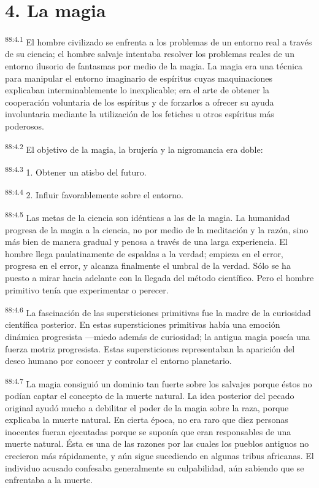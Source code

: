 \documentclass[twoside, 11pt]{book}
\begin{document}
\section*{4. La magia}
\par
\textsuperscript{88:4.1} El hombre civilizado se enfrenta a los problemas de un entorno real a través de su ciencia; el hombre salvaje intentaba resolver los problemas reales de un entorno ilusorio de fantasmas por medio de la magia. La magia era una técnica para manipular el entorno imaginario de espíritus cuyas maquinaciones explicaban interminablemente lo inexplicable; era el arte de obtener la cooperación voluntaria de los espíritus y de forzarlos a ofrecer su ayuda involuntaria mediante la utilización de los fetiches u otros espíritus más poderosos.

\par
\textsuperscript{88:4.2} El objetivo de la magia, la brujería y la nigromancia era doble:

\par
\textsuperscript{88:4.3} 1. Obtener un atisbo del futuro.

\par
\textsuperscript{88:4.4} 2. Influir favorablemente sobre el entorno.

\par
\textsuperscript{88:4.5} Las metas de la ciencia son idénticas a las de la magia. La humanidad progresa de la magia a la ciencia, no por medio de la meditación y la razón, sino más bien de manera gradual y penosa a través de una larga experiencia. El hombre llega paulatinamente de espaldas a la verdad; empieza en el error, progresa en el error, y alcanza finalmente el umbral de la verdad. Sólo se ha puesto a mirar hacia adelante con la llegada del método científico. Pero el hombre primitivo tenía que experimentar o perecer.

\par
\textsuperscript{88:4.6} La fascinación de las supersticiones primitivas fue la madre de la curiosidad científica posterior. En estas supersticiones primitivas había una emoción dinámica progresista ---miedo además de curiosidad; la antigua magia poseía una fuerza motriz progresista. Estas supersticiones representaban la aparición del deseo humano por conocer y controlar el entorno planetario.

\par
\textsuperscript{88:4.7} La magia consiguió un dominio tan fuerte sobre los salvajes porque éstos no podían captar el concepto de la muerte natural. La idea posterior del pecado original ayudó mucho a debilitar el poder de la magia sobre la raza, porque explicaba la muerte natural. En cierta época, no era raro que diez personas inocentes fueran ejecutadas porque se suponía que eran responsables de una muerte natural. Ésta es una de las razones por las cuales los pueblos antiguos no crecieron más rápidamente, y aún sigue sucediendo en algunas tribus africanas. El individuo acusado confesaba generalmente su culpabilidad, aún sabiendo que se enfrentaba a la muerte.
\end{document}

